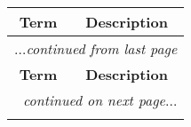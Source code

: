\begin{center}
\begin{longtable}{m{} m{} }
\hline
\hline \multicolumn{1}{c}{\textbf{Term}} &
       \multicolumn{1}{c}{\textbf{Description}} \\ \hline
\endfirsthead

\multicolumn{2}{r}{\textit{\footnotesize $\ldots$continued from last page}} \\
\hline \multicolumn{1}{c}{\textbf{Term}} &
       \multicolumn{1}{c}{\textbf{Description}} \\ \hline
\endhead

\hline \multicolumn{2}{r}{\textit{\footnotesize continued on next page$\ldots$}} \\
\endfoot

\endlastfoot


\end{longtable}
\end{center}

